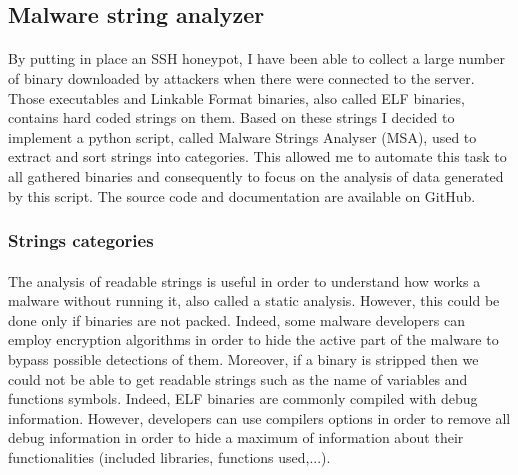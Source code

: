 \subsection{Malware string analyzer} %

\paragraph{}

By putting in place an SSH honeypot, I have been able to collect a large number of binary 
downloaded by attackers when there were connected to the server. Those executables and 
Linkable Format binaries, also called ELF binaries, contains hard coded strings on them.
Based on these strings I decided to implement a python script, called Malware Strings 
Analyser (MSA), used to extract and sort strings into categories. This allowed me to 
automate this task to all gathered binaries and consequently to focus on the analysis of 
data generated by this script. The source code and documentation are available on GitHub.

\subsubsection{Strings categories} %

\paragraph{}

The analysis of readable strings is useful in order to understand how works a malware
without running it, also called a static analysis. However, this could be done only if
binaries are not packed. Indeed, some malware developers can employ encryption algorithms
in order to hide the active part of the malware to bypass possible detections of them.
Moreover, if a binary is stripped then we could not be able to get readable
strings such as the name of variables and functions symbols. Indeed, ELF binaries are 
commonly compiled with debug information. However, developers can use compilers options in
order to remove all debug information in order to hide a maximum of information about their
functionalities (included libraries, functions used,...).

